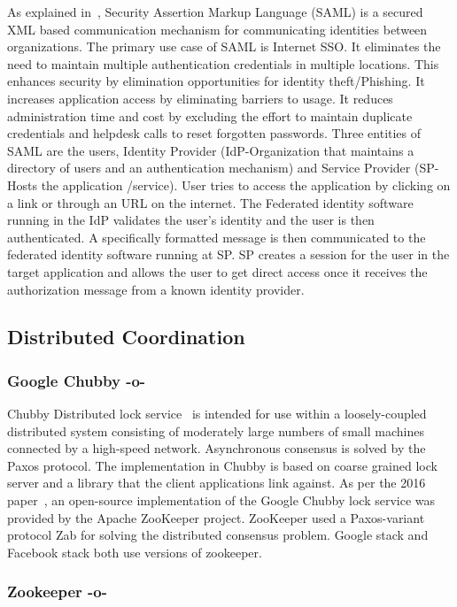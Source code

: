 As explained in~\cite{www-SAML}, Security Assertion Markup Language
(SAML) is a secured XML based communication mechanism for
communicating identities between organizations. The primary use case
of SAML is Internet SSO. It eliminates the need to maintain multiple
authentication credentials in multiple locations. This enhances
security by elimination opportunities for identity theft/Phishing. It
increases application access by eliminating barriers to usage. It
reduces administration time and cost by excluding the effort to
maintain duplicate credentials and helpdesk calls to reset forgotten
passwords. Three entities of SAML are the users, Identity Provider
(IdP-Organization that maintains a directory of users and an
authentication mechanism) and Service Provider (SP-Hosts the
application /service). User tries to access the application by
clicking on a link or through an URL on the internet. The Federated
identity software running in the IdP validates the user's identity and
the user is then authenticated. A specifically formatted message is
then communicated to the federated identity software running at SP. SP
creates a session for the user in the target application and allows
the user to get direct access once it receives the authorization
message from a known identity provider.

\subsection{Distributed Coordination}


\subsubsection{Google Chubby -o-}

Chubby Distributed lock service~\cite{www-chubby} is intended for use
within a loosely-coupled distributed system consisting of moderately
large numbers of small machines connected by a high-speed
network. Asynchronous consensus is solved by the Paxos protocol. The
implementation in Chubby is based on coarse grained lock server and a
library that the client applications link against.  As per the 2016
paper~\cite{chubby-paper-2016}, an open-source implementation of the
Google Chubby lock service was provided by the Apache ZooKeeper
project. ZooKeeper used a Paxos-variant protocol Zab for solving the
distributed consensus problem.  Google stack and Facebook stack both
use versions of zookeeper.
     
\subsubsection{Zookeeper -o-}
 
